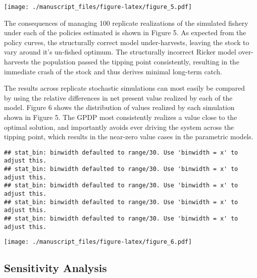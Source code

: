 \documentclass[]{components/elsarticle}
\begin{document}
\texttt{[image: ./manuscript\_files/figure-latex/figure\_5.pdf]}

The consequences of managing 100 replicate realizations of the simulated
fishery under each of the policies estimated is shown in Figure 5. As
expected from the policy curves, the structurally correct model
under-harvests, leaving the stock to vary around it's un-fished optimum.
The structurally incorrect Ricker model over-harvests the population
passed the tipping point consistently, resulting in the immediate crash
of the stock and thus derives minimal long-term catch.

The results across replicate stochastic simulations can most easily be
compared by using the relative differences in net present value realized
by each of the model. Figure 6 shows the distribution of values realized
by each simulation shown in Figure 5. The GPDP most consistently
realizes a value close to the optimal solution, and importantly avoids
ever driving the system across the tipping point, which results in the
near-zero value cases in the parametric models.

\begin{verbatim}
## stat_bin: binwidth defaulted to range/30. Use 'binwidth = x' to adjust this.
## stat_bin: binwidth defaulted to range/30. Use 'binwidth = x' to adjust this.
## stat_bin: binwidth defaulted to range/30. Use 'binwidth = x' to adjust this.
## stat_bin: binwidth defaulted to range/30. Use 'binwidth = x' to adjust this.
## stat_bin: binwidth defaulted to range/30. Use 'binwidth = x' to adjust this.
\end{verbatim}

\texttt{[image: ./manuscript\_files/figure-latex/figure\_6.pdf]}

\subsection{Sensitivity Analysis}\label{sensitivity-analysis}
\end{document}
